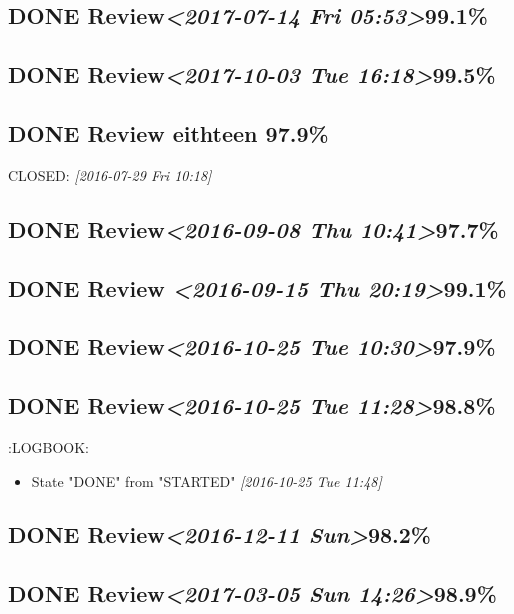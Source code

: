 \documentclass[11pt]{ctexart}
\begin{document}
\subsection{{\bfseries\sffamily DONE} Review\textit{<2017-07-14 Fri 05:53>}99.1\%}
\label{sec:org23f6f1d}
\subsection{{\bfseries\sffamily DONE} Review\textit{<2017-10-03 Tue 16:18>}99.5\%}
\label{sec:org83c8e9f}
\subsection{{\bfseries\sffamily DONE} Review eithteen 97.9\%}
\label{sec:org5860d1f}

CLOSED: \textit{[2016-07-29 Fri 10:18]}

\subsection{{\bfseries\sffamily DONE} Review\textit{<2016-09-08 Thu 10:41>}97.7\%}
\label{sec:org96460f3}
\subsection{{\bfseries\sffamily DONE} Review \textit{<2016-09-15 Thu 20:19>}99.1\%}
\label{sec:org5620872}
\subsection{{\bfseries\sffamily DONE} Review\textit{<2016-10-25 Tue 10:30>}97.9\%}
\label{sec:orge852bfd}
\subsection{{\bfseries\sffamily DONE} Review\textit{<2016-10-25 Tue 11:28>}98.8\%}
\label{sec:orgc77717f}
:LOGBOOK:
\begin{itemize}
\item State "DONE"       from "STARTED"    \textit{[2016-10-25 Tue 11:48]}
\end{itemize}
\subsection{{\bfseries\sffamily DONE} Review\textit{<2016-12-11 Sun>}98.2\%}
\label{sec:org0407ce7}
\subsection{{\bfseries\sffamily DONE} Review\textit{<2017-03-05 Sun 14:26>}98.9\%}
\label{sec:org7040e5a}
\end{document}
